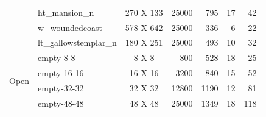 \documentclass[letterpaper]{article} %
\begin{document}
\begin{table}
{\begin{tabular}{@{}llcrrrr@{}}
                                                                           & ht\_mansion\_n          & 270 X 133  & 25000    & 795    & 17                      & 42                      \\
                                                                           & w\_woundedcoast         & 578 X 642  & 25000    & 336    & 6                       & 22                      \\
                                                                           & lt\_gallowstemplar\_n   & 180 X 251  & 25000    & 493    & 10                       & 32                      \\
\midrule \multirow{4}{*}{Open}                                                      &                                                                             empty-8-8               & 8 X 8      & 800      & 528    & 18                      & 25                      \\
& empty-16-16             & 16 X 16    & 3200     & 840    & 15                       & 52                      \\
                                                                           & empty-32-32             & 32 X 32    & 12800    & 1190   & 12                       & 81                      \\
                                                                           & empty-48-48             & 48 X 48    & 25000    & 1349   & 18                      & 118                     \\


\end{tabular}}
\end{table}
\end{document}
